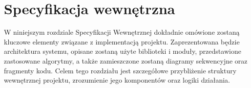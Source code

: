 \chapter{Specyfikacja wewnętrzna}
\label{ch:05}

W niniejszym rozdziale Specyfikacji Wewnętrznej dokładnie omówione zostaną kluczowe elementy związane z implementacją projektu. Zaprezentowana będzie architektura systemu, opisane zostaną użyte biblioteki i moduły, przedstawione zastosowane algorytmy, a także zamieszczone zostaną diagramy sekwencyjne oraz fragmenty kodu. Celem tego rozdziału jest szczegółowe przybliżenie struktury wewnętrznej projektu, zrozumienie jego komponentów oraz logiki działania.

